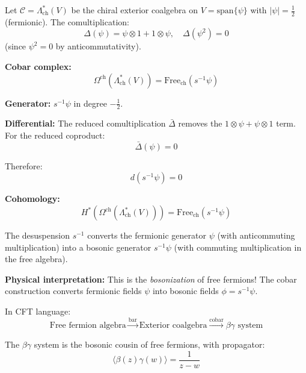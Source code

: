 \begin{example}\label{ex:cobar-fermion-complete}

Let $\mathcal{C} = \Lambda^*_{\text{ch}}(V)$ be the chiral exterior coalgebra on 
$V = \text{span}\{\psi\}$ with $|\psi| = \frac{1}{2}$ (fermionic). The comultiplication:
$$\Delta(\psi) = \psi \otimes 1 + 1 \otimes \psi, \quad \Delta(\psi^2) = 0$$
(since $\psi^2 = 0$ by anticommutativity).

\textbf{Cobar complex:}
$$\Omega^{\text{ch}}(\Lambda^*_{\text{ch}}(V)) = \text{Free}_{\text{ch}}(s^{-1}\psi)$$

\textbf{Generator:} $s^{-1}\psi$ in degree $-\frac{1}{2}$.

\textbf{Differential:}
The reduced comultiplication $\bar{\Delta}$ removes the $1 \otimes \psi + \psi \otimes 1$ 
term. For the reduced coproduct:
$$\bar{\Delta}(\psi) = 0$$

Therefore:
$$d(s^{-1}\psi) = 0$$

\textbf{Cohomology:}
$$H^*(\Omega^{\text{ch}}(\Lambda^*_{\text{ch}}(V))) = \text{Free}_{\text{ch}}(s^{-1}\psi)$$

The desuspension $s^{-1}$ converts the fermionic generator $\psi$ (with 
anticommuting multiplication) into a bosonic generator $s^{-1}\psi$ (with commuting 
multiplication in the free algebra).

\textbf{Physical interpretation:} This is the \emph{bosonization} of free fermions! 
The cobar construction converts fermionic fields $\psi$ into bosonic fields $\phi = s^{-1}\psi$.

In CFT language:
$$\text{Free fermion algebra} \xrightarrow{\text{bar}} \text{Exterior coalgebra} 
\xrightarrow{\text{cobar}} \beta\gamma \text{ system}$$

The $\beta\gamma$ system is the bosonic cousin of free fermions, with propagator:
$$\langle \beta(z) \gamma(w) \rangle = \frac{1}{z - w}$$
\end{example}

